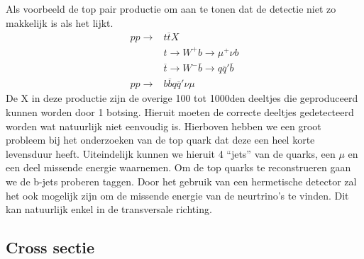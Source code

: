 \documentclass[../main.tex]{subfiles}
\begin{document}
Als voorbeeld de top pair productie om aan te tonen dat de detectie niet zo makkelijk is als het lijkt.
\begin{equation}
    \begin{aligned}
        \label{eq:top_prod}
        pp \rightarrow &t\overline t X\\
                       &t\rightarrow W^+b\rightarrow \mu^+\nu b\\
                       &\overline t \rightarrow W^-\overline b \rightarrow q\overline q' \overline b\\
        pp \rightarrow &b\overline bq\overline q' \nu\mu
    \end{aligned}
\end{equation}
De X in deze productie zijn de overige 100 tot 1000den deeltjes die geproduceerd kunnen worden door 1 botsing. Hieruit moeten de correcte deeltjes gedetecteerd worden wat natuurlijk niet eenvoudig is. Hierboven hebben we een groot probleem bij het onderzoeken van de top quark dat deze een heel korte levensduur heeft. Uiteindelijk kunnen we hieruit 4 ``jets'' van de quarks, een $\mu$ en een deel missende energie waarnemen. Om de top quarks te reconstrueren gaan we de b-jets proberen taggen. Door het gebruik van een hermetische detector zal het ook mogelijk zijn om de missende energie van de neurtrino's te vinden. Dit kan natuurlijk enkel in de transversale richting.

\subsection{Cross sectie}%
\label{sub:cross_sectie}
\end{document}
